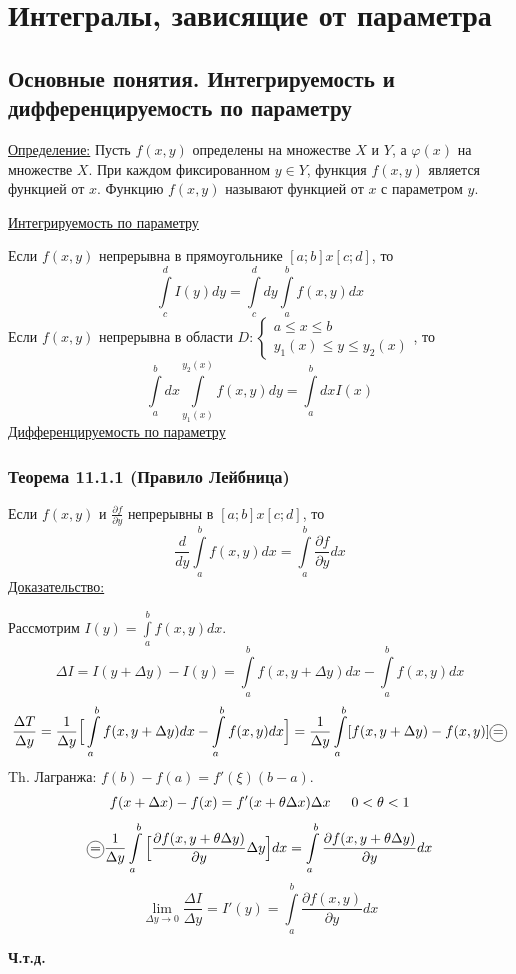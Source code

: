 \documentclass[12pt]{article}
\newcommand*\circled[1]{\tikz[baseline=(char.base)]{
    \node[shape=circle, draw, inner sep=1pt, 
        minimum height=12pt] (char) {#1};}}
\let\oldint\int
\let\oldlim\lim
\renewcommand{\int}{\oldint\limits}
\renewcommand{\lim}{\oldlim\limits}
\begin{document}
    \section{Интегралы, зависящие от параметра}
    \subsection{Основные понятия. Интегрируемость и дифференцируемость по параметру}
    \underline{Определение:} Пусть $f(x, y)$ определены на множестве $X$ и $Y$, а $\varphi(x)$ на множестве $X$. При каждом фиксированном $y \in Y$, функция $f(x, y)$ является функцией от $x$. Функцию $f(x, y)$ называют функцией от $x$ с параметром $y$.\par\noindent
    \underline{Интегрируемость по параметру}\par\noindent
    Если $f(x, y)$ непрерывна в прямоугольнике $[a; b] x [c; d]$, то
    \[ \int_{c}^{d} I(y)dy = \int_{c}^{d}dy \int_{a}^{b} f(x, y) dx \]
    Если $f(x, y)$ непрерывна в области $D: \begin{cases*}
      a \leq x \leq b \\
      y_1(x) \leq y \leq y_2(x)
    \end{cases*}$, то
    \[ \int_{a}^{b} dx \int_{y_1(x)}^{y_2(x)}f(x, y)dy = \int_{a}^{b}dx I(x) \]\noindent
    \underline{Дифференцируемость по параметру}\par\noindent
    \subsubsection*{Теорема 11.1.1 (Правило Лейбница)}\label{th:11.1.1}
    Если $f(x, y)$ и $\frac{\partial f}{\partial y}$ непрерывны в $[a; b]x[c; d]$, то
    \[ \frac{d}{dy} \int_{a}^{b}f(x, y)dx = \int_{a}^{b} \frac{\partial f}{\partial y} dx \]
    \underline{Доказательство:}
    \begin{adjustwidth}{1.5em}{1.5em}
      Рассмотрим $I(y) = \int_{a}^{b} f(x, y)dx$.
      \[ \Delta I = I(y + \Delta y) - I(y) = \int_{a}^{b}f(x, y + \Delta y)dx - \int_{a}^{b}f(x, y)dx \]
      \[ \frac{\Delta T}{\Delta y} = \frac{1}{\Delta y} \Big[ \int_{a}^{b}f(x, y + \Delta y)dx - \int_{a}^{b} f(x, y) dx \Big] = \frac{1}{\Delta y} \int_{a}^{b} [ f(x, y + \Delta y) - f(x, y) ] \circled{=} \]
      Th. Лагранжа: $f(b) - f(a) = f'(\xi)(b-a)$.
      \[ f(x + \Delta x) - f(x) = f'(x + \theta \Delta x)\Delta x \indent 0 < \theta < 1 \]
      \[ \circled{=} \frac{1}{\Delta y}\int_{a}^{b} \Big[ \frac{\partial f(x, y + \theta \Delta y)}{\partial y} \Delta y \Big] dx = \int_{a}^{b} \frac{\partial f(x, y + \theta \Delta y)}{\partial y} dx \]
      \[ \lim_{\Delta y \to 0} \frac{\Delta I}{\Delta y} = I'(y) = \int_{a}^{b} \frac{\partial f(x, y)}{\partial y} dx \]
      \begin{center}
          \textbf{Ч.т.д.}
      \end{center} 
    \end{adjustwidth}
\end{document}
